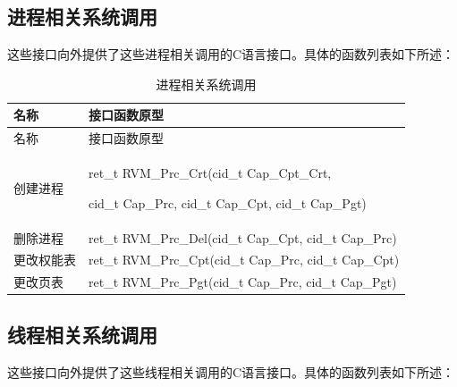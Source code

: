 \subsection{进程相关系统调用}\label{subsec:3-5-4}

这些接口向外提供了这些进程相关调用的C语言接口。具体的函数列表如下所述：

\begin{xltabular}{\textwidth}{@{}>{\hsize\raggedright\arraybackslash}X>{\hsize\raggedright\arraybackslash}X@{}}
\caption{进程相关系统调用}\label{tab:3-8}\\
\toprule
名称 & 接口函数原型\tabularnewline
\endfirsthead
\toprule
名称 & 接口函数原型\tabularnewline
\midrule
\endhead
\bottomrule
\endlastfoot
创建进程\strut
 & ret\_\allowbreak{}t RVM\_\allowbreak{}Prc\_\allowbreak{}Crt(cid\_\allowbreak{}t Cap\_\allowbreak{}Cpt\_\allowbreak{}Crt,

cid\_\allowbreak{}t Cap\_\allowbreak{}Prc, cid\_\allowbreak{}t Cap\_\allowbreak{}Cpt, cid\_\allowbreak{}t Cap\_\allowbreak{}Pgt)\strut
\tabularnewline
删除进程 & ret\_\allowbreak{}t RVM\_\allowbreak{}Prc\_\allowbreak{}Del(cid\_\allowbreak{}t Cap\_\allowbreak{}Cpt, cid\_\allowbreak{}t
Cap\_\allowbreak{}Prc)\tabularnewline
更改权能表 & ret\_\allowbreak{}t RVM\_\allowbreak{}Prc\_\allowbreak{}Cpt(cid\_\allowbreak{}t Cap\_\allowbreak{}Prc, cid\_\allowbreak{}t
Cap\_\allowbreak{}Cpt)\tabularnewline
更改页表 & ret\_\allowbreak{}t RVM\_\allowbreak{}Prc\_\allowbreak{}Pgt(cid\_\allowbreak{}t Cap\_\allowbreak{}Prc, cid\_\allowbreak{}t
Cap\_\allowbreak{}Pgt)\tabularnewline
\end{xltabular}

\subsection{线程相关系统调用}\label{subsec:3-5-5}

这些接口向外提供了这些线程相关调用的C语言接口。具体的函数列表如下所述：

